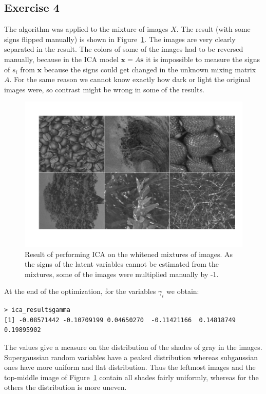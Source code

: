 \documentclass{article}
\renewcommand\vec[1]{\ensuremath{\mathbf{#1}}}
\begin{document}
\subsection{Exercise 4}

The algorithm was applied to the mixture of images $X$.
The result (with some signs flipped manually) is shown in Figure~\ref{fig:icares}.
The images are very clearly separated in the result.
The colors of some of the images had to be reversed manually, because in the ICA model $\vec x=A\vec s$ it is impossible to measure the signs of $s_i$ from \vec{x} because the signs could get changed in the unknown mixing matrix $A$.
For the same reason we cannot know exactly how dark or light the original images were, so contrast might be wrong in some of the results.

\begin{figure}\centering
	\includegraphics[scale=\iscale]{icares}
	\caption{Result of performing ICA on the whitened mixtures of images.
	As the signs of the latent variables cannot be estimated from the mixtures, some of the images were multiplied manually by -1.}\label{fig:icares}
\end{figure}

At the end of the optimization, for the variables $\gamma_i$ we obtain:
\begin{verbatim}
> ica_result$gamma
[1] -0.08571442 -0.10709199 0.04650270  -0.11421166  0.14818749  0.19895902
\end{verbatim}
The values give a measure on the distribution of the shades of gray in the images.
Supergaussian random variables have a peaked distribution whereas subgaussian ones have more uniform and flat distribution.
Thus the leftmost images and the top-middle image of Figure~\ref{fig:icares} contain all shades fairly uniformly, whereas for the others the distribution is more uneven.
\end{document}
